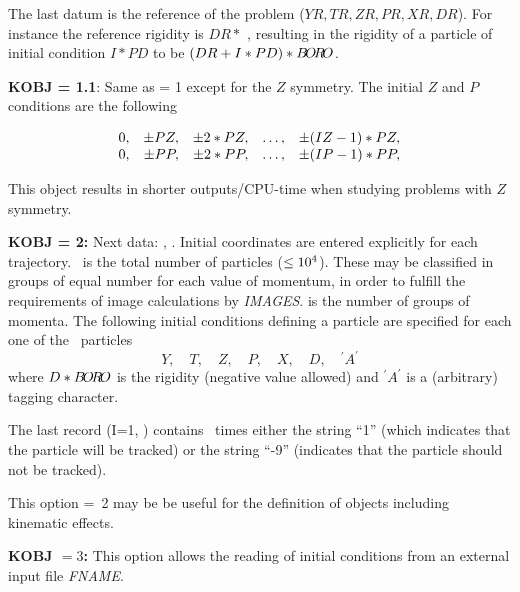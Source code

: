 \noindent The last datum is the reference of the problem ($YR,TR,ZR,PR,XR,DR$). 
For instance the reference rigidity is $ DR \ast$ \BORO, resulting 
 in the rigidity of a particle of initial condition $ I\ast PD $ to be 
$ (DR+I\ast PD)\ast B\!O\!R\!O$. 

\bigskip

\noindent\textbf{KOBJ = 1.1}: Same as \KOBJ = 1    except for the $ Z $
symmetry.  The initial 
$ Z $ and $ P $ conditions are the following 

$$
  \begin{array}{*{5}{r<{,}}}
	  0  &  \pm PZ &   \pm 2  \ast   PZ & \ldots & \pm (IZ-1)   \ast   PZ \\
	  0  &  \pm PP &   \pm 2 \ast   PP  & \ldots &  \pm (IP-1)  \ast   PP 
  \end{array}
 $$


\noindent This object results in shorter outputs/CPU-time when studying problems with $Z $ symmetry.  

\bigskip

\noindent\textbf{KOBJ = 2:}  Next data: \IMAX{},  
\IDMAX{}. Initial coordinates
are entered explicitly for each 
trajectory.  \IMAX\  is the total number of particles (\IMAX$\leq 10^4$).  
These may be classified in groups of equal number for each value of momentum, in order to 
fulfill the requirements of image calculations by \textsl{IMAGES}. 
 \IDMAX{} is the 
number of groups of momenta.  The  following initial 
conditions defining a particle are specified for each one of the \IMAX\  
 particles
 $$ Y,\quad T,\quad Z,\quad P, \quad X, \quad D,\quad ^\prime A^\prime $$
%
 where $ D\ast B\!O\!R\!O$ is the rigidity (negative value   
 allowed) and $ ^\prime A^\prime $ is a
(arbitrary) tagging character.  


\noindent The last record \IEX{} (I=1, \IMAX)  contains 
\IMAX\  times either the string ``1'' (which indicates that the particle will be
tracked) or the string ``\mbox{-9}''  (indicates that the particle should not be tracked).  

\noindent This option \mbox{\KOBJ= 2}   may be be useful for the
definition of objects including kinematic  effects.  
\bigskip


\newpage 


\noindent\textbf{KOBJ $= 3$:} This option allows the reading of initial conditions from an
external input file \textsl{FNAME}.  

